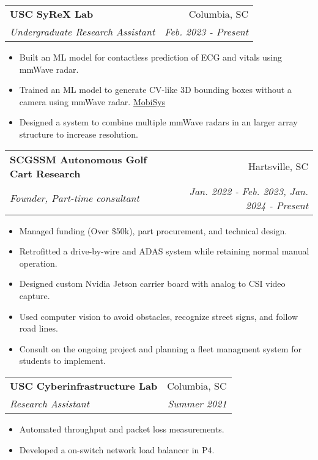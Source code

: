 \documentclass[letterpaper,11pt]{article}
\makeatletter
\newcommand{\resumeItem}[2]{
  \item\small{
    \textbf{#1}{: #2 \vspace{-2pt}}
  }
}
\newcommand{\resumeItemLine}[1]{
  \item\small{
    {#1 \vspace{-2pt}}
  }
}
\newcommand{\resumeSubheading}[4]{
  \vspace{-1pt}\item
    \begin{tabular*}{0.97\textwidth}{l@{\extracolsep{\fill}}r}
      \textbf{#1} & #2 \\
      \textit{\small#3} & \textit{\small #4} \\
    \end{tabular*}\vspace{-5pt}
}
\newcommand{\resumeItemListStart}{\begin{itemize}}
\newcommand{\resumeItemListEnd}{\end{itemize}\vspace{-5pt}}
\makeatother
\begin{document}
    \resumeSubheading
      {USC SyReX Lab}{Columbia, SC}
      {Undergraduate Research Assistant}{Feb. 2023 - Present}
      \resumeItemListStart
        \resumeItemLine
          {Built an ML model for contactless prediction of ECG and vitals using mmWave radar.}
        \resumeItemLine
          {Trained an ML model to generate CV-like 3D bounding boxes without a camera using mmWave radar. \hyperlink{https://doi.org/10.1145/3643832.3661416}{MobiSys}}
        \resumeItemLine
          {Designed a system to combine multiple mmWave radars in an larger array structure to increase resolution.}

    \resumeItemListEnd


    \resumeSubheading
      {SCGSSM Autonomous Golf Cart Research}{Hartsville, SC}
      {Founder, Part-time consultant}{Jan. 2022 - Feb. 2023, Jan. 2024 - Present}
      \resumeItemListStart
        \resumeItemLine
          {Managed funding (Over \$50k), part procurement, and technical design.}
        \resumeItemLine
          {Retrofitted a drive-by-wire and ADAS system while retaining normal manual operation.}
        \resumeItemLine
          {Designed custom Nvidia Jetson carrier board with analog to CSI video capture.}
        \resumeItemLine
          {Used computer vision to avoid obstacles, recognize street signs, and follow road lines.}
        \resumeItemLine
          {Consult on the ongoing project and planning a fleet managment system for students to implement.}
      \resumeItemListEnd

    \resumeSubheading
      {USC Cyberinfrastructure Lab}{Columbia, SC}
      {Research Assistant}{Summer 2021}
      \resumeItemListStart
        \resumeItemLine
          {Automated throughput and packet loss measurements.}
        \resumeItemLine
          {Developed a on-switch network load balancer in P4.}
      \resumeItemListEnd
\end{document}
